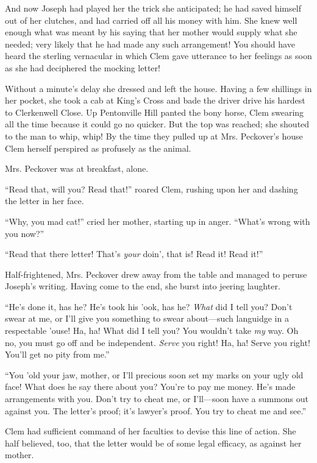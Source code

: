 And now Joseph had played her the trick she anticipated; he had saved
himself out of her clutches, and had carried off all his money with him.
She knew well enough what was meant by his saying that her mother would
supply what she needed; very likely that he had made any such
arrangement! You should have heard the sterling vernacular in which Clem
gave utterance to her feelings as soon as she had deciphered the mocking
letter!

Without a minute's delay she dressed and left the house. Having a few
shillings in her pocket, she took a cab at King's Cross and bade the
driver drive his hardest to Clerkenwell Close. Up Pentonville Hill
panted the bony horse, Clem swearing all the time because it could go no
quicker. But the top was reached; she shouted to the man to whip, whip!
By the time they pulled up at Mrs. Peckover's house Clem herself
perspired as profusely as the animal.

Mrs. Peckover was at breakfast, alone.

``Read that, will you? Read that!'' roared {}Clem, rushing upon her and
dashing the letter in her face.

``Why, you mad cat!'' cried her mother, starting up in anger. ``What's
wrong with you now?''

``Read that there letter! That's \emph{your} doin', that is! Read it!
Read it!''

Half-frightened, Mrs. Peckover drew away from the table and managed to
peruse Joseph's writing. Having come to the end, she burst into jeering
laughter.

``He's done it, has he? He's took his 'ook, has he? \emph{What} did I
tell you? Don't swear at me, or I'll give you something to swear
about---such languidge in a respectable 'ouse! Ha, ha! What did I tell
you? You wouldn't take \emph{my} way. Oh no, you must go off and be
independent. \emph{Serve} you right! Ha, ha! Serve you right! You'll get
no pity from me.''

``You 'old your jaw, mother, or I'll precious soon set my marks on your
ugly old face! What does he say there about you? You're to pay me money.
He's made arrangements with you. Don't try to cheat me, or I'll---soon
have a summons out against you. The {}letter's proof; it's lawyer's
proof. You try to cheat me and see.''

Clem had sufficient command of her faculties to devise this line of
action. She half believed, too, that the letter would be of some legal
efficacy, as against her mother.

